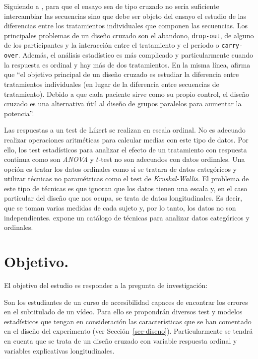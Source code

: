 \documentclass[
  12pt,
  a4paper,
  extrafontsizes,
  onecolumn,
  openright]{memoir}
\begin{document}
Siguiendo a \textcite{senn2022}, para que el ensayo sea de tipo cruzado
no sería suficiente intercambiar las secuencias sino que debe ser objeto
del ensayo el estudio de las diferencias entre los tratamientos
individuales que componen las secuencias. Los principales problemas de
un diseño cruzado son el abandono, \texttt{drop-out}, de alguno de los
participantes y la interacción entre el tratamiento y el periodo o
\texttt{carry-over}. Además, el análisis estadístico es más complicado y
particularmente cuando la respuesta es ordinal y hay más de dos
tratamientos. En la misma línea, \textcite{lui2016} afirma que
\enquote{el objetivo principal de un diseño cruzado es estudiar la
diferencia entre tratamientos individuales (en lugar de la diferencia
entre secuencias de tratamiento). Debido a que cada paciente sirve como
su propio control, el diseño cruzado es una alternativa útil al diseño
de grupos paralelos para aumentar la potencia}.

Las respuestas a un test de Likert se realizan en escala ordinal. No es
adecuado realizar operaciones aritméticas para calcular medias con este
tipo de datos. Por ello, los test estadísticos para analizar el efecto
de un tratamiento con respuesta continua como son \emph{ANOVA} y
\(t\)-test no son adecuados con datos ordinales. Una opción es tratar
los datos ordinales como si se tratara de datos categóricos y utilizar
técnicas no paramétricas como el test de \emph{Kruskal-Wallis}. El
problema de este tipo de técnicas es que ignoran que los datos tienen
una escala y, en el caso particular del diseño que nos ocupa, se trata
de datos longitudinales. Es decir, que se toman varias medidas de cada
sujeto y, por lo tanto, los datos no son independientes.
\textcite{agresti2010} expone un catálogo de técnicas para analizar
datos categóricos y ordinales.

\hypertarget{objetivo.}{%
\section{Objetivo.}\label{objetivo.}}

El objetivo del estudio es responder a la pregunta de investigación:

Son los estudiantes de un curso de accesibilidad capaces de encontrar
los errores en el subtitulado de un vídeo. Para ello se propondrán
diversos test y modelos estadísticos que tengan en consideración las
características que se han comentado en el diseño del experimento (ver
Sección~\ref{sec-diseno}). Particularmente se tendrá en cuenta que se
trata de un diseño cruzado con variable respuesta ordinal y variables
explicativas longitudinales.
\end{document}
